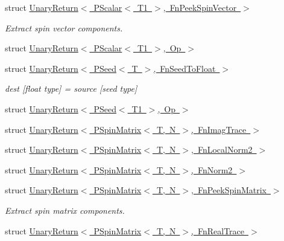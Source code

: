 \begin{DoxyCompactItemize}
\item 
struct \mbox{\hyperlink{structENSEM_1_1UnaryReturn_3_01PScalar_3_01T1_01_4_00_01FnPeekSpinVector_01_4}{Unary\+Return$<$ P\+Scalar$<$ T1 $>$, Fn\+Peek\+Spin\+Vector $>$}}
\begin{DoxyCompactList}\small\item\em Extract spin vector components. \end{DoxyCompactList}\item 
struct \mbox{\hyperlink{structENSEM_1_1UnaryReturn_3_01PScalar_3_01T1_01_4_00_01Op_01_4}{Unary\+Return$<$ P\+Scalar$<$ T1 $>$, Op $>$}}
\item 
struct \mbox{\hyperlink{structENSEM_1_1UnaryReturn_3_01PSeed_3_01T_01_4_00_01FnSeedToFloat_01_4}{Unary\+Return$<$ P\+Seed$<$ T $>$, Fn\+Seed\+To\+Float $>$}}
\begin{DoxyCompactList}\small\item\em dest \mbox{[}float type\mbox{]} = source \mbox{[}seed type\mbox{]} \end{DoxyCompactList}\item 
struct \mbox{\hyperlink{structENSEM_1_1UnaryReturn_3_01PSeed_3_01T1_01_4_00_01Op_01_4}{Unary\+Return$<$ P\+Seed$<$ T1 $>$, Op $>$}}
\item 
struct \mbox{\hyperlink{structENSEM_1_1UnaryReturn_3_01PSpinMatrix_3_01T_00_01N_01_4_00_01FnImagTrace_01_4}{Unary\+Return$<$ P\+Spin\+Matrix$<$ T, N $>$, Fn\+Imag\+Trace $>$}}
\item 
struct \mbox{\hyperlink{structENSEM_1_1UnaryReturn_3_01PSpinMatrix_3_01T_00_01N_01_4_00_01FnLocalNorm2_01_4}{Unary\+Return$<$ P\+Spin\+Matrix$<$ T, N $>$, Fn\+Local\+Norm2 $>$}}
\item 
struct \mbox{\hyperlink{structENSEM_1_1UnaryReturn_3_01PSpinMatrix_3_01T_00_01N_01_4_00_01FnNorm2_01_4}{Unary\+Return$<$ P\+Spin\+Matrix$<$ T, N $>$, Fn\+Norm2 $>$}}
\item 
struct \mbox{\hyperlink{structENSEM_1_1UnaryReturn_3_01PSpinMatrix_3_01T_00_01N_01_4_00_01FnPeekSpinMatrix_01_4}{Unary\+Return$<$ P\+Spin\+Matrix$<$ T, N $>$, Fn\+Peek\+Spin\+Matrix $>$}}
\begin{DoxyCompactList}\small\item\em Extract spin matrix components. \end{DoxyCompactList}\item 
struct \mbox{\hyperlink{structENSEM_1_1UnaryReturn_3_01PSpinMatrix_3_01T_00_01N_01_4_00_01FnRealTrace_01_4}{Unary\+Return$<$ P\+Spin\+Matrix$<$ T, N $>$, Fn\+Real\+Trace $>$}}
\item 

\end{DoxyCompactItemize}
